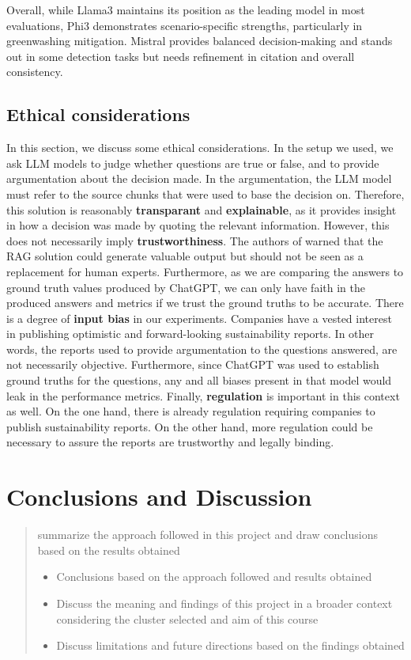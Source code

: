 \documentclass[]{article}
\begin{document}
Overall, while Llama3 maintains its position as the leading model in most evaluations, Phi3 demonstrates scenario-specific strengths, particularly in greenwashing mitigation. 
Mistral provides balanced decision-making and stands out in some detection tasks but needs refinement in citation and overall consistency.  

\subsection{Ethical considerations}

In this section, we discuss some ethical considerations.
In the setup we used, we ask LLM models to judge whether questions are true or false, and to provide argumentation about the decision made.
In the argumentation, the LLM model must refer to the source chunks that were used to base the decision on.
Therefore, this solution is reasonably \textbf{transparant} and \textbf{explainable}, as it provides insight in how a decision was made by quoting the relevant information.
However, this does not necessarily imply \textbf{trustworthiness}.
The authors of \cite{durability} warned that the RAG solution could generate valuable output but should not be seen as a replacement for human experts.
Furthermore, as we are comparing the answers to ground truth values produced by ChatGPT, we can only have faith in the produced answers and metrics if we trust the ground truths to be accurate.
There is a degree of \textbf{input bias} in our experiments.
Companies have a vested interest in publishing optimistic and forward-looking sustainability reports.
In other words, the reports used to provide argumentation to the questions answered, are not necessarily objective.
Furthermore, since ChatGPT was used to establish ground truths for the questions, any and all biases present in that model would leak in the performance metrics.
Finally, \textbf{regulation} is important in this context as well.
On the one hand, there is already regulation requiring companies to publish sustainability reports.
On the other hand, more regulation could be necessary to assure the reports are trustworthy and legally binding.

\section{Conclusions and Discussion} \label{sec:conclusions}

\begin{quotation}
    summarize the approach followed in this project and draw conclusions based on the results obtained
    \begin{itemize}
        \item Conclusions based on the approach followed and results obtained
        \item Discuss the meaning and findings of this project in a broader context considering the cluster selected and aim of this course
        \item Discuss limitations and future directions based on the findings obtained
    \end{itemize}
\end{quotation}

\printbibliography
\end{document}
